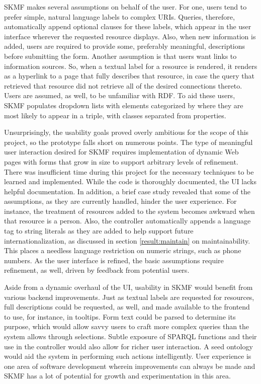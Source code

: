 SKMF makes several assumptions on behalf of the user. For one, users tend to prefer simple, natural language labels to complex URIs. Queries, therefore, automatically append optional clauses for these labels, which appear in the user interface wherever the requested resource displays. Also, when new information is added, users are required to provide some, preferably meaningful, descriptions before submitting the form. Another assumption is that users want links to information sources. So, when a textual label for a resource is rendered, it renders as a hyperlink to a page that fully describes that resource, in case the query that retrieved that resource did not retrieve all of the desired connections thereto. Users are assumed, as well, to be unfamiliar with RDF. To aid these users, SKMF populates dropdown lists with elements categorized by where they are most likely to appear in a triple, with classes separated from properties.

Unsurprisingly, the usability goals proved overly ambitious for the scope of this project, so the prototype falls short on numerous points. The type of meaningful user interaction desired for SKMF requires implementation of dynamic Web pages with forms that grow in size to support arbitrary levels of refinement. There was insufficient time during this project for the necessary techniques to be learned and implemented. While the code is thoroughly documented, the UI lacks helpful documentation. In addition, a brief case study revealed that some of the assumptions, as they are currently handled, hinder the user experience. For instance, the treatment of resources added to the system becomes awkward when that resource is a person. Also, the controller automatically appends a language tag to string literals as they are added to help support future internationalization, as discussed in section
\ref{result:maintain}
on maintainability. This places a needless language restriction on numeric strings, such as phone numbers. As the user interface is refined, the basic assumptions require refinement, as well, driven by feedback from potential users.

Aside from a dynamic overhaul of the UI, usability in SKMF would benefit from various backend improvements. Just as textual labels are requested for resources, full descriptions could be requested, as well, and made available to the frontend to use, for instance, in tooltips. Form text could be parsed to determine its purpose, which would allow savvy users to craft more complex queries than the system allows through selections. Subtle exposure of SPARQL functions and their use in the controller would also allow for richer user interaction. A seed ontology would aid the system in performing such actions intelligently. User experience is one area of software development wherein improvements can always be made and SKMF has a lot of potential for growth and experimentation in this area.


